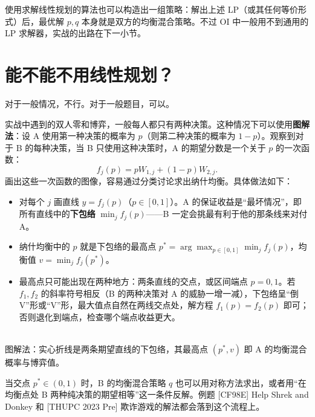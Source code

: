 \documentclass[UTF8,a4paper,11pt,oneside,openany,fontset=fandol]{ctexbook}
\theoremstyle{definition}
\begin{document}
使用求解线性规划的算法也可以构造出一组策略：解出上述 LP（或其任何等价形式）后，最优解 $p,q$ 本身就是双方的均衡混合策略。不过 OI 中一般用不到通用的 LP 求解器，实战的出路在下一小节。

\section{能不能不用线性规划？}
对于一般情况，不行。对于一般题目，可以。

实战中遇到的双人零和博弈，一般每人都只有两种决策。这种情况下可以使用\textbf{图解法}：设 A 使用第一种决策的概率为 $p$（则第二种决策的概率为 $1-p$）。观察到对于 B 的每种决策，当 B 只使用这种决策时，A 的期望分数是一个关于 $p$ 的一次函数：
\[
 f_j(p)=pW_{1,j}+(1-p)W_{2,j}.
\]
画出这些一次函数的图像，容易通过分类讨论求出纳什均衡。具体做法如下：
\begin{itemize}
\item 对每个 $j$ 画直线 $y=f_j(p)$（$p\in[0,1]$）。A 的保证收益是“最坏情况”，即所有直线中的\textbf{下包络} $\min_j f_j(p)$——B 一定会挑最有利于他的那条线来对付 A。
\item 纳什均衡中的 $p$ 就是下包络的最高点 $p^*=\arg\max_{p\in[0,1]}\min_j f_j(p)$，均衡值 $v=\min_j f_j(p^*)$。
\item 最高点只可能出现在两种地方：两条直线的交点，或区间端点 $p=0,1$。若 $f_1,f_2$ 的斜率符号相反（B 的两种决策对 A 的威胁一增一减），下包络呈“倒 V”形或“V”形，最大值点自然在两线交点处，解方程 $f_1(p)=f_2(p)$ 即可；否则退化到端点，检查哪个端点收益更大。
\end{itemize}

\begin{center}
\\[2pt]
{\small 图解法：实心折线是两条期望直线的下包络，其最高点 $(p^*,v)$ 即 A 的均衡混合概率与博弈值。}
\end{center}

当交点 $p^*\in(0,1)$ 时，B 的均衡混合策略 $q$ 也可以用对称方法求出，或者用“在均衡点处 B 两种纯决策的期望相等”这一条件反解。例题 [CF98E] Help Shrek and Donkey 和 [THUPC 2023 Pre] 欺诈游戏的解法都会落到这个流程上。
\end{document}
